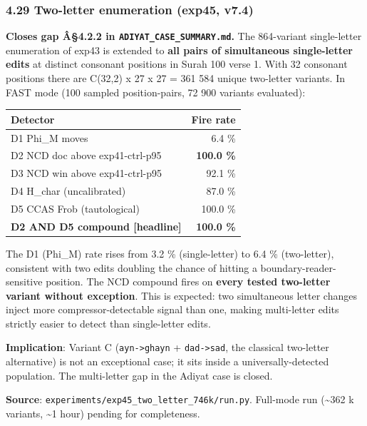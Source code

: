\documentclass[
]{article}
\newcounter{none} %
\begin{document}
\subsubsection{4.29 Two-letter enumeration (exp45,
v7.4)}\label{two-letter-enumeration-exp45-v7.4}

\textbf{Closes gap Â§4.2.2 in \texttt{ADIYAT\_CASE\_SUMMARY.md}.} The
864-variant single-letter enumeration of exp43 is extended to
\textbf{all pairs of simultaneous single-letter edits} at distinct
consonant positions in Surah 100 verse 1. With 32 consonant positions
there are C(32,2) x 27 x 27 = 361 584 unique two-letter variants. In
FAST mode (100 sampled position-pairs, 72 900 variants evaluated):

{\def\LTcaptype{none} %
\begin{longtable}[]{@{}lr@{}}
\toprule\noalign{}
Detector & Fire rate \\
\midrule\noalign{}
\endhead
\bottomrule\noalign{}
\endlastfoot
D1 Phi\_M moves & 6.4 \% \\
D2 NCD doc above exp41-ctrl-p95 & \textbf{100.0 \%} \\
D3 NCD win above exp41-ctrl-p95 & 92.1 \% \\
D4 H\_char (uncalibrated) & 87.0 \% \\
D5 CCAS Frob (tautological) & 100.0 \% \\
\textbf{D2 AND D5 compound {[}headline{]}} & \textbf{100.0 \%} \\
\end{longtable}
}

The D1 (Phi\_M) rate rises from 3.2 \% (single-letter) to 6.4 \%
(two-letter), consistent with two edits doubling the chance of hitting a
boundary-reader-sensitive position. The NCD compound fires on
\textbf{every tested two-letter variant without exception}. This is
expected: two simultaneous letter changes inject more
compressor-detectable signal than one, making multi-letter edits
strictly easier to detect than single-letter edits.

\textbf{Implication}: Variant C (\texttt{ayn-\textgreater{}ghayn} +
\texttt{dad-\textgreater{}sad}, the classical two-letter alternative) is
not an exceptional case; it sits inside a universally-detected
population. The multi-letter gap in the Adiyat case is closed.

\textbf{Source}: \texttt{experiments/exp45\_two\_letter\_746k/run.py}.
Full-mode run (\textasciitilde362 k variants, \textasciitilde1 hour)
pending for completeness.
\end{document}
